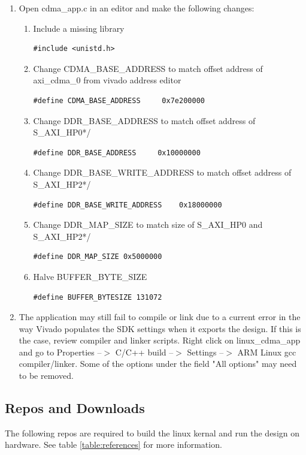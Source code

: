 \documentclass[12pt]{article}
\begin{document}
\begin{enumerate}
\item Open cdma\_app.c in an editor and make the following changes:
\begin{enumerate}
\item Include a missing library
\begin{lstlisting}
#include <unistd.h>
\end{lstlisting}
\item Change CDMA\_BASE\_ADDRESS to match offset address of axi\_cdma\_0 from vivado address editor
\begin{lstlisting}
#define CDMA_BASE_ADDRESS     0x7e200000
\end{lstlisting}
\item Change DDR\_BASE\_ADDRESS to match offset address of S\_AXI\_HP0*/
\begin{lstlisting}
#define DDR_BASE_ADDRESS     0x10000000
\end{lstlisting}
\item Change DDR\_BASE\_WRITE\_ADDRESS to match offset address of S\_AXI\_HP2*/
\begin{lstlisting}
#define DDR_BASE_WRITE_ADDRESS    0x18000000
\end{lstlisting}
\item Change DDR\_MAP\_SIZE to match size of S\_AXI\_HP0 and S\_AXI\_HP2*/
\begin{lstlisting}
#define DDR_MAP_SIZE 0x5000000
\end{lstlisting}
\item Halve BUFFER\_BYTE\_SIZE
\begin{lstlisting}
#define BUFFER_BYTESIZE	131072
\end{lstlisting}

\end{enumerate}
\item The application may still fail to compile or link due to a current error in the way Vivado populates the SDK settings when it exports the design.  If this is the case, review compiler and linker scripts.  Right click on linux\_cdma\_app and go to Properties --$>$ C/C++ build --$>$ Settings --$>$ ARM Linux gcc compiler/linker.  Some of the options under the field "All options" may need to be removed.
\end{enumerate}
\subsection{Repos and Downloads}\label{subsec:repos}The following repos are required to build the linux kernal and run the design on hardware.  See table \ref{table:references} for more information.
\\
\end{document}
